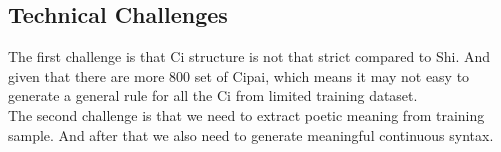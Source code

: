 \subsection{Technical Challenges}
The first challenge is that Ci structure is not that strict compared to Shi. And given that there are more 800 set of Cipai, which means it may not easy to generate a general rule for all the Ci from limited training dataset.\\

The second challenge is that we need to extract poetic meaning from training sample. And after that we also need to generate meaningful continuous syntax.


 